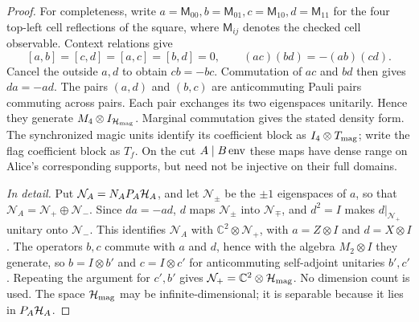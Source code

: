 \begin{proof}
For completeness, write $a=\mathsf M_{00},b=\mathsf M_{01},c=\mathsf M_{10},d=\mathsf M_{11}$ for the four top-left cell reflections of the square, where $\mathsf M_{ij}$ denotes the checked cell observable. Context relations give
\[
 [a,b]=[c,d]=[a,c]=[b,d]=0,\qquad
 (ac)(bd)=-(ab)(cd).
\]
Cancel the outside $a,d$ to obtain $cb=-bc$. Commutation of $ac$ and $bd$ then gives $da=-ad$. The pairs $(a,d)$ and $(b,c)$ are anticommuting Pauli pairs commuting across pairs. Each pair exchanges its two eigenspaces unitarily. Hence they generate $M_4\otimes I_{\mathcal H_{\rm mag}}$. Marginal commutation gives the stated density form. The synchronized magic units identify its coefficient block as
$I_4\otimes T_{\rm mag}$; write the flag coefficient block as $T_f$.
On the cut $A\mid B\,{\rm env}$ these maps have dense range on
Alice's corresponding supports, but need not be injective on their
full domains.

\emph{In detail.} Put $\mathcal N_A=N_AP_A\mathcal H_A$, and let $\mathcal N_\pm$ be the $\pm1$ eigenspaces of $a$, so that $\mathcal N_A=\mathcal N_+\oplus\mathcal N_-$. Since $da=-ad$, $d$ maps $\mathcal N_\pm$ into $\mathcal N_\mp$, and $d^2=I$ makes $d|_{\mathcal N_+}$ unitary onto $\mathcal N_-$. This identifies $\mathcal N_A$ with $\mathbb C^2\otimes\mathcal N_+$, with $a=Z\otimes I$ and $d=X\otimes I$. The operators $b,c$ commute with $a$ and $d$, hence with the algebra $M_2\otimes I$ they generate, so $b=I\otimes b'$ and $c=I\otimes c'$ for anticommuting self-adjoint unitaries $b',c'$. Repeating the argument for $c',b'$ gives $\mathcal N_+=\mathbb C^2\otimes\mathcal H_{\rm mag}$. No dimension count is used. The space $\mathcal H_{\rm mag}$ may be infinite-dimensional; it is separable because it lies in $P_A\mathcal H_A$.


\end{proof}
